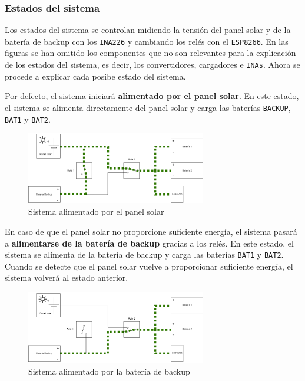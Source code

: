 \subsubsection{Estados del sistema}

Los estados del sistema se controlan midiendo la tensión del panel solar y de la batería de backup con los \texttt{INA226} y cambiando los relés con el \texttt{ESP8266}. En las figuras se han omitido los componentes que no son relevantes para la explicación de los estados del sistema, es decir, los convertidores, cargadores e \texttt{INAs}. Ahora se procede a explicar cada posibe estado del sistema.

Por defecto, el sistema iniciará \textbf{alimentado por el panel solar}. En este estado, el sistema se alimenta directamente del panel solar y carga las baterías \texttt{BACKUP}, \texttt{BAT1} y \texttt{BAT2}.

\begin{figure}[H]
    \centering
    \includegraphics[width=0.7\textwidth]{images/2-hardware/Estado_solar.png}
    \caption{Sistema alimentado por el panel solar}
    \label{fig:hardware/estados/solar}
\end{figure}

En caso de que el panel solar no proporcione suficiente energía, el sistema pasará a \textbf{alimentarse de la batería de backup} gracias a los relés. En este estado, el sistema se alimenta de la batería de backup y carga las baterías \texttt{BAT1} y \texttt{BAT2}. Cuando se detecte que el panel solar vuelve a proporcionar suficiente energía, el sistema volverá al estado anterior.

\begin{figure}[H]
    \centering
    \includegraphics[width=0.7\textwidth]{images/2-hardware/Estado_backup.png}
    \caption{Sistema alimentado por la batería de backup}
    \label{fig:hardware/estados/backup}
\end{figure}


